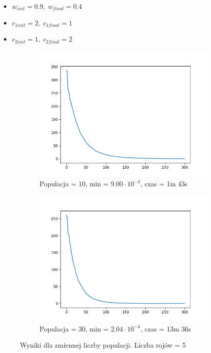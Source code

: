 \documentclass[12pt]{article}
\begin{document}
\begin{itemize}
    \item $w_{init} = 0.9,\; w_{final} = 0.4$
    \item $c_{1init} = 2,\; c_{1final} = 1$
    \item $c_{2init} = 1,\; c_{2final} = 2$
\end{itemize}
\begin{figure}[H]
    \centering
    \begin{subfigure}{0.49\textwidth}
        \centering
        \includegraphics[width=\linewidth]{plots/MSPSO/1_best.png}
        \caption{Populacja = 10, min = $9.00\cdot 10^{-3}$, czas = 1m 43s}
    \end{subfigure}
    \begin{subfigure}{0.49\textwidth}
        \centering
        \includegraphics[width=\linewidth]{plots/MSPSO/2_best.png}
        \caption{Populacja = 30, min = $2.04\cdot 10^{-4}$, czas = 13m 36s}
    \end{subfigure}
    \caption{Wyniki dla zmiennej liczby populacji. Liczba rojów = 5}
\end{figure}
\end{document}
